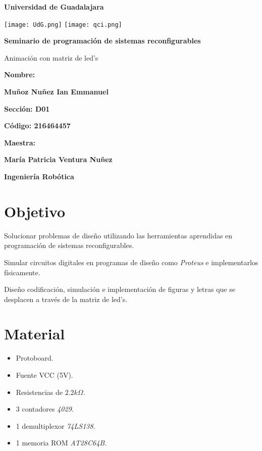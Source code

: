 \documentclass[12pt, oneside]{article}
\begin{document}
\begin{titlepage}
    \centering
    {\bfseries\LARGE Universidad de Guadalajara \par}
    \vfill
    {
        \texttt{[image: UdG.png]}
        \texttt{[image: qci.png]}
        \par
    }
    \vfill
    {\bfseries\LARGE Seminario de programación de sistemas reconfigurables \par}
    \vfill
    {\ttfamily\LARGE Animación con matriz de led's \par}
    \vfill
    {\bfseries\LARGE Nombre: \par}
    \vfill
    {\bfseries\LARGE Muñoz Nuñez Ian Emmanuel \par}
    \vfill
    {\bfseries\LARGE Sección: D01 \par}
    \vfill
    {\bfseries\LARGE Código: 216464457 \par}
    \vfill
    {\bfseries\LARGE Maestra: \par}
    \vfill
    {\bfseries\LARGE María Patricia Ventura Nuñez \par}
    \vfill
    {\bfseries\LARGE Ingeniería Robótica \par}
\end{titlepage}


\newpage
\section{Objetivo}
{\sffamily\large
    \hspace{0.5cm} Solucionar problemas de diseño utilizando las herramientas aprendidas en
    programación de sistemas reconfigurables.

    \hspace{0.5cm} Simular circuitos digitales en programas de diseño como
    \emph{Proteus\textregistered} e implementarlos físicamente.

    \hspace{0.5cm} Diseño codificación, simulación e implementación de figuras y letras que se
    desplacen a través de la matriz de led's.

}

\section{Material}
{\sffamily\large
    \renewcommand{\labelitemi}{$\bullet$}
    \begin{itemize}
        \item Protoboard.
        \item Fuente VCC (5V).
        \item Resistencias de $2.2k\Omega$.
        \item 3 contadores \emph{4029}.
        \item 1 demultiplexor \emph{74LS138}.
        \item 1 memoria ROM \emph{AT28C64B}.
    \end{itemize}

}
\end{document}

